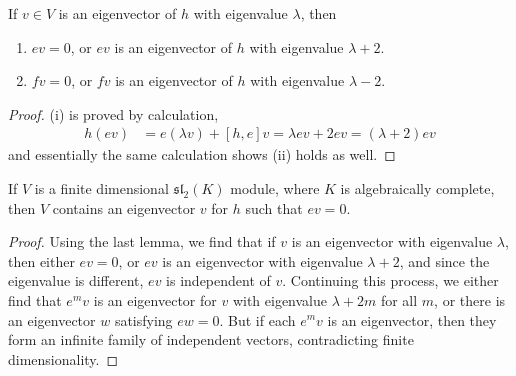 \begin{lemma}
    If $v \in V$ is an eigenvector of $h$ with eigenvalue $\lambda$, then
    \begin{enumerate}
        \item[(i)] $ev = 0$, or $ev$ is an eigenvector of $h$ with eigenvalue $\lambda + 2$.
        \item[(ii)] $fv = 0$, or $fv$ is an eigenvector of $h$ with eigenvalue $\lambda - 2$.
    \end{enumerate}
\end{lemma}
\begin{proof}
    (i) is proved by calculation,
    \begin{align*}
        h(ev) &= e(\lambda v) + [h, e] v = \lambda ev + 2ev = (\lambda + 2) ev
    \end{align*}
    and essentially the same calculation shows (ii) holds as well.
\end{proof}

\begin{lemma}
    If $V$ is a finite dimensional $\mathfrak{sl}_2(K)$ module, where $K$ is algebraically complete, then $V$ contains an eigenvector $v$ for $h$ such that $ev = 0$.
\end{lemma}
\begin{proof}
    Using the last lemma, we find that if $v$ is an eigenvector with eigenvalue $\lambda$, then either $ev = 0$, or $ev$ is an eigenvector with eigenvalue $\lambda + 2$, and since the eigenvalue is different, $ev$ is independent of $v$. Continuing this process, we either find that $e^m v$ is an eigenvector for $v$ with eigenvalue $\lambda + 2m$ for all $m$, or there is an eigenvector $w$ satisfying $ew = 0$. But if each $e^m v$ is an eigenvector, then they form an infinite family of independent vectors, contradicting finite dimensionality.
\end{proof}


